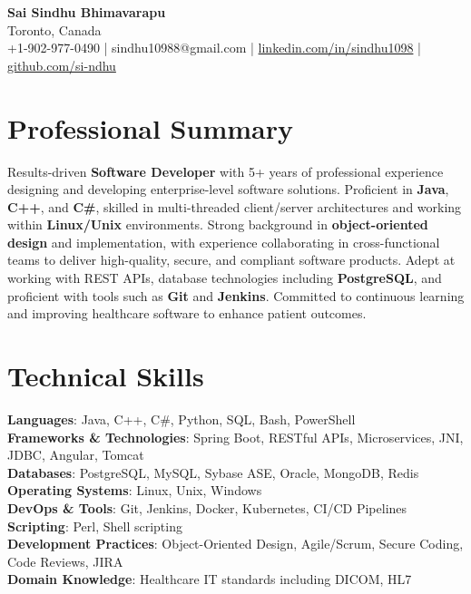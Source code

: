 \documentclass[letterpaper,11pt]{article}
\begin{document}
\begin{center}
  {\Large \textbf{Sai Sindhu Bhimavarapu}} \\
  Toronto, Canada \\
  +1-902-977-0490 \enspace | \enspace sindhu10988@gmail.com \enspace | \enspace \href{https://www.linkedin.com/in/sindhu1098/}{linkedin.com/in/sindhu1098} \enspace | \enspace \href{https://github.com/si-ndhu}{github.com/si-ndhu}
\end{center}

\section{Professional Summary}
  \begin{itemize}[leftmargin=0.15in, label={}]
    \small{\item{
     Results-driven \textbf{Software Developer} with 5+ years of professional experience designing and developing enterprise-level software solutions. Proficient in \textbf{Java}, \textbf{C++}, and \textbf{C\#}, skilled in multi-threaded client/server architectures and working within \textbf{Linux/Unix} environments. Strong background in \textbf{object-oriented design} and implementation, with experience collaborating in cross-functional teams to deliver high-quality, secure, and compliant software products. Adept at working with REST APIs, database technologies including \textbf{PostgreSQL}, and proficient with tools such as \textbf{Git} and \textbf{Jenkins}. Committed to continuous learning and improving healthcare software to enhance patient outcomes.
    }}
  \end{itemize}
\vspace{-16pt}

\section{Technical Skills}
 \begin{itemize}[leftmargin=0.15in, label={}]
    \small{\item{
     \textbf{Languages}: Java, C++, C\#, Python, SQL, Bash, PowerShell \\
     \textbf{Frameworks \& Technologies}: Spring Boot, RESTful APIs, Microservices, JNI, JDBC, Angular, Tomcat \\
     \textbf{Databases}: PostgreSQL, MySQL, Sybase ASE, Oracle, MongoDB, Redis \\
     \textbf{Operating Systems}: Linux, Unix, Windows \\
     \textbf{DevOps \& Tools}: Git, Jenkins, Docker, Kubernetes, CI/CD Pipelines \\
     \textbf{Scripting}: Perl, Shell scripting \\
     \textbf{Development Practices}: Object-Oriented Design, Agile/Scrum, Secure Coding, Code Reviews, JIRA \\
     \textbf{Domain Knowledge}: Healthcare IT standards including DICOM, HL7 \\
    }}
 \end{itemize}
\vspace{-16pt}
\end{document}
